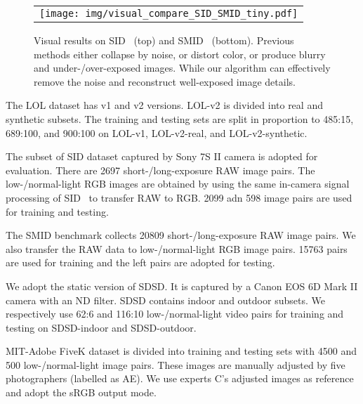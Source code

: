 \documentclass[10pt,twocolumn,letterpaper]{article}
\begin{document}
\begin{figure*}[t]
	\begin{center}
		\begin{tabular}[t]{c} \hspace{-3.3mm}
\texttt{[image: img/visual\_compare\_SID\_SMID\_tiny.pdf]}
\end{tabular}
	\end{center}
	\vspace*{-4mm}
	\caption{\small Visual results on SID~\cite{sid} (top) and SMID~\cite{smid} (bottom). Previous methods either collapse by noise, or distort color, or produce blurry and under-/over-exposed images. While our algorithm can effectively remove the noise and reconstruct well-exposed image details. }
	\label{fig:compare_sid_smid}
	\vspace{-3mm}
\end{figure*}


 The LOL dataset has v1 and v2 versions. LOL-v2 is divided into real and synthetic subsets. The training and testing sets are split in proportion to 485:15, 689:100,
and 900:100 on LOL-v1, LOL-v2-real, and LOL-v2-synthetic. 



 The subset of SID dataset captured by Sony 7S II  camera is adopted for evaluation. There are 2697 short-/long-exposure RAW image pairs. The low-/normal-light RGB images are obtained by using the same in-camera signal processing of SID~\cite{sid} to transfer RAW to RGB. 2099 adn 598 image pairs are used for training and testing.

 The SMID benchmark collects 20809 short-/long-exposure RAW image pairs. We also transfer the RAW data to low-/normal-light RGB image pairs. 15763 pairs are used for training and the left pairs are adopted for testing.

 We adopt the static version of SDSD. It is captured by a Canon EOS 6D Mark II camera with an ND filter. SDSD contains indoor and outdoor subsets. We respectively use 62:6 and 116:10 low-/normal-light video pairs for training and testing on SDSD-indoor and SDSD-outdoor.

 MIT-Adobe FiveK dataset is divided into training and testing sets with 4500 and 500 low-/normal-light image pairs. These images are manually adjusted by five photographers (labelled as AE). We use experts
C’s adjusted images as reference and adopt the sRGB output mode.
\end{document}
